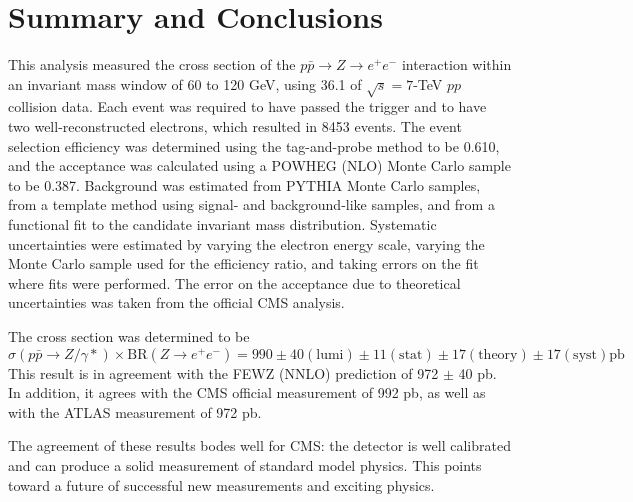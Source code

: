 \chapter{Summary and Conclusions}
\label{summ}

This analysis measured the cross section of the 
$p\bar{p} \rightarrow Z \rightarrow e^+ e^-$ 
interaction within an invariant mass window of 60 to 120 GeV, 
using 36.1 \pb of $\sqrt{s} = 7$-TeV $pp$ collision data.  
Each event was required to have passed the trigger 
and to have two well-reconstructed electrons, 
which resulted in 8453 events.  
The event selection efficiency was determined using the 
tag-and-probe method to be 0.610, 
and the acceptance was calculated using a 
POWHEG (NLO) Monte Carlo \Zee sample to be 0.387.  
Background was estimated from PYTHIA Monte Carlo samples, 
from a template method using signal- and background-like 
samples, 
and from a functional fit to the 
candidate invariant mass distribution.  
Systematic uncertainties were estimated 
by varying the electron energy scale, 
varying the Monte Carlo sample used for the efficiency ratio, 
and taking errors on the fit where fits were performed.  
The error on the acceptance due to theoretical uncertainties 
was taken from the official CMS analysis.  

The cross section was determined to be 
\[
\sigma(p \bar{p} \rightarrow Z/\gamma *) \times \mathrm{BR}(Z \rightarrow e^+ e^- )
= 990 \pm 40 \mathrm{(lumi)} \pm 11 \mathrm{(stat)} \pm 17 \mathrm{(theory)} \pm 17 \mathrm{(syst)} \mathrm{pb}
\]
This result is in agreement with the FEWZ (NNLO) 
prediction of 972 $\pm$ 40 pb.  
In addition, it agrees with the CMS official measurement of 992 pb, 
as well as with the ATLAS measurement of 972 pb.  

The agreement of these results bodes well for CMS: 
the detector is well calibrated and can produce 
a solid measurement of standard model physics.  
This points toward a future of successful new 
measurements and exciting physics.  

